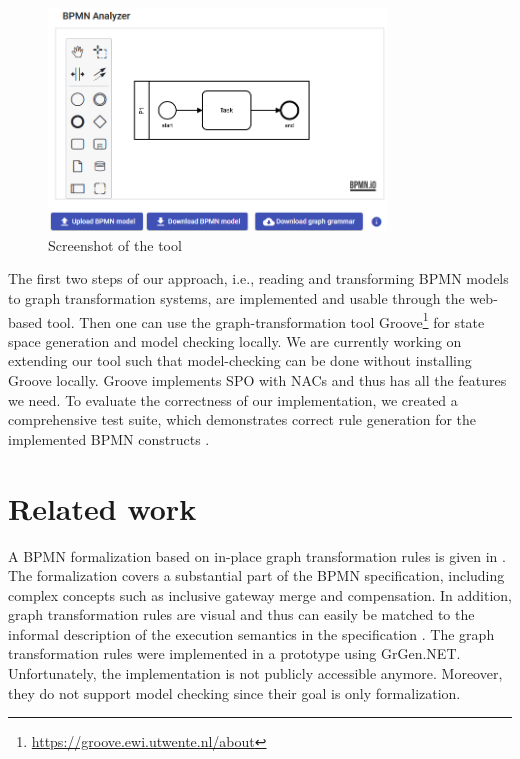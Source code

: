 \documentclass[submission, copyright, creativecommons]{eptcs}
\begin{document}
\begin{figure}[h]
    \centering
    \includegraphics[width=0.8\textwidth]{images/impl.png}
    \caption{Screenshot of the tool}
    \label{fig:implScreenshot}
\end{figure}

The first two steps of our approach, i.e., reading and transforming BPMN models to graph transformation systems, are implemented and usable through the web-based tool.
Then one can use the graph-transformation tool Groove\footnote{\url{https://groove.ewi.utwente.nl/about}} for state space generation and model checking locally.
We are currently working on extending our tool such that model-checking can be done without installing Groove locally.
Groove implements SPO with NACs and thus has all the features we need.
To evaluate the correctness of our implementation, we created a comprehensive test suite, which demonstrates correct rule generation for the implemented BPMN constructs \cite{timkrauterArtifactsTERMGRAPH2022}.

\section{Related work} \label{sec:relatedWork}
A BPMN formalization based on in-place graph transformation rules is given in \cite{vangorpVisualTokenbasedFormalization2013}.
The formalization covers a substantial part of the BPMN specification, including complex concepts such as inclusive gateway merge and compensation.
In addition, graph transformation rules are visual and thus can easily be matched to the informal description of the execution semantics in the specification \cite{objectmanagementgroupBusinessProcessModel2013}.
The graph transformation rules were implemented in a prototype using GrGen.NET.
Unfortunately, the implementation is not publicly accessible anymore.
Moreover, they do not support model checking since their goal is only formalization.
\end{document}
